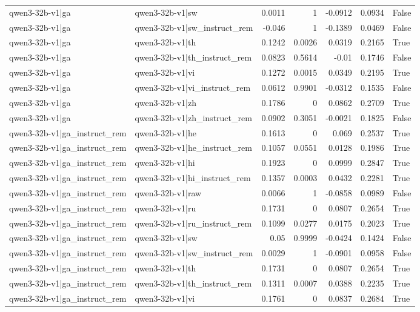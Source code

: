 \begin{table}
\begin{tabular}{l l r r r r l}
qwen3-32b-v1|ga & qwen3-32b-v1|sw & 0.0011 & 1 & -0.0912 & 0.0934 & False \\
qwen3-32b-v1|ga & qwen3-32b-v1|sw_instruct_rem & -0.046 & 1 & -0.1389 & 0.0469 & False \\
qwen3-32b-v1|ga & qwen3-32b-v1|th & 0.1242 & 0.0026 & 0.0319 & 0.2165 & True \\
qwen3-32b-v1|ga & qwen3-32b-v1|th_instruct_rem & 0.0823 & 0.5614 & -0.01 & 0.1746 & False \\
qwen3-32b-v1|ga & qwen3-32b-v1|vi & 0.1272 & 0.0015 & 0.0349 & 0.2195 & True \\
qwen3-32b-v1|ga & qwen3-32b-v1|vi_instruct_rem & 0.0612 & 0.9901 & -0.0312 & 0.1535 & False \\
qwen3-32b-v1|ga & qwen3-32b-v1|zh & 0.1786 & 0 & 0.0862 & 0.2709 & True \\
qwen3-32b-v1|ga & qwen3-32b-v1|zh_instruct_rem & 0.0902 & 0.3051 & -0.0021 & 0.1825 & False \\
qwen3-32b-v1|ga_instruct_rem & qwen3-32b-v1|he & 0.1613 & 0 & 0.069 & 0.2537 & True \\
qwen3-32b-v1|ga_instruct_rem & qwen3-32b-v1|he_instruct_rem & 0.1057 & 0.0551 & 0.0128 & 0.1986 & True \\
qwen3-32b-v1|ga_instruct_rem & qwen3-32b-v1|hi & 0.1923 & 0 & 0.0999 & 0.2847 & True \\
qwen3-32b-v1|ga_instruct_rem & qwen3-32b-v1|hi_instruct_rem & 0.1357 & 0.0003 & 0.0432 & 0.2281 & True \\
qwen3-32b-v1|ga_instruct_rem & qwen3-32b-v1|raw & 0.0066 & 1 & -0.0858 & 0.0989 & False \\
qwen3-32b-v1|ga_instruct_rem & qwen3-32b-v1|ru & 0.1731 & 0 & 0.0807 & 0.2654 & True \\
qwen3-32b-v1|ga_instruct_rem & qwen3-32b-v1|ru_instruct_rem & 0.1099 & 0.0277 & 0.0175 & 0.2023 & True \\
qwen3-32b-v1|ga_instruct_rem & qwen3-32b-v1|sw & 0.05 & 0.9999 & -0.0424 & 0.1424 & False \\
qwen3-32b-v1|ga_instruct_rem & qwen3-32b-v1|sw_instruct_rem & 0.0029 & 1 & -0.0901 & 0.0958 & False \\
qwen3-32b-v1|ga_instruct_rem & qwen3-32b-v1|th & 0.1731 & 0 & 0.0807 & 0.2654 & True \\
qwen3-32b-v1|ga_instruct_rem & qwen3-32b-v1|th_instruct_rem & 0.1311 & 0.0007 & 0.0388 & 0.2235 & True \\
qwen3-32b-v1|ga_instruct_rem & qwen3-32b-v1|vi & 0.1761 & 0 & 0.0837 & 0.2684 & True \\

\end{tabular}
\end{table}
